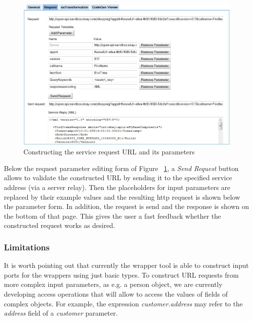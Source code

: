 \begin{figure}
  \begin{center}
    \includegraphics[width=\linewidth]{images/ServiceWrapperToolGVSWithRequestExample.png}
    \caption{Constructing the service request URL and its parameters}
    \label{fig:construct_service_request}
  \end{center}
\end{figure}

Below the request parameter editing form of Figure ~\ref{fig:construct_service_request}, a \textit{Send Request} button allows to validate the constructed URL by sending it to the specified service address (via a server relay). Then the placeholders for input parameters are replaced by their example values and the resulting http request is shown below the parameter form. In addition, the request is send and the response is shown on the bottom of that page. This gives the user a fast feedback whether the constructed request works as desired. 

\subsubsection{Limitations} %
\label{ssub:limitations}



It is worth pointing out that currently the wrapper tool is able to construct input ports for the wrappers using just basic types. To construct URL requests from more complex input parameters, as e.g. a person object, we are currently developing access operations that will allow to access the values of fields of complex objects. For example, the expression \emph{customer.address} may refer to the \emph{address} field of a \emph{customer} parameter.  

